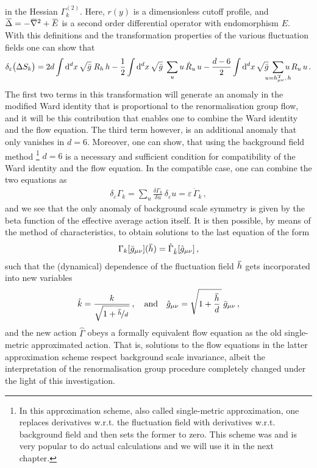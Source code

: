\documentclass[11pt]{book}
\newcommand{\overbar}[1]{\mkern 1.5mu\overline{\mkern-1.5mu#1\mkern-1.5mu}\mkern 1.5mu}
\newcommand\hT{ h^{\scriptscriptstyle{\mathrm{T}} } }
\newcommand{\bnabla}{\overbar \nabla}
\newcommand{\weyl}{\delta_\varepsilon}
\numberwithin{equation}{chapter}
\begin{document}
in the Hessian $\Gamma^{(2)}_k$. Here, $r(y)$ is a dimensionless cutoff profile, and
$\overbar \Delta = -\bnabla^2 + \overbar E$ is a second order differential operator with
endomorphism $E$. With this definitions and the transformation properties of the various
fluctuation fields one can show that
\begin{align}
  \weyl \big( \Delta S_k \big) =
  2d \int \mathrm d^dx \, \sqrt{\bar g} \; R_h \, h
  - \frac 12 \int \mathrm d^dx \, \sqrt{\bar g} \; \sum_u u \, \dot R_u \, u
  - \frac {d-6}2 \int \mathrm d^dx \, \sqrt{\bar g} \;
  \smashoperator{\sum_{u=\hT_{\mu\nu},\,h}} u \, R_u \, u \,.
\end{align}
The first two terms in this transformation will generate an anomaly in the modified Ward
identity that is proportional to the renormalisation group flow, and it will be this
contribution that enables one to combine the Ward identity and the flow equation. The
third term however, is an additional anomaly that only vanishes in $d=6$. Moreover,
one can show, that using the background field method%
\footnote{%
  In this approximation scheme, also called single-metric approximation, one
  replaces derivatives w.r.t. the fluctuation field with derivatives w.r.t. background
  field and then sets the former to zero. This scheme was and is very popular
  to do actual calculations and we will use it in the next chapter.
}
$d=6$ is a necessary and sufficient condition for compatibility of the Ward identity and
the flow equation.
In the compatible case, one can combine the two equations as
\begin{align}
  \weyl \Gamma_k = \sum_u \frac{ \delta \Gamma_k }{ \delta u } \, \weyl u
  = \varepsilon \, \dot \Gamma_k \,,
\end{align}
and we see that the only anomaly of background scale symmetry is given by the
beta function of the effective average action itself.
It is then possible, by means of the method of characteristics, to obtain
solutions to the last equation of the form
\begin{align}
  \Gamma_k [ \bar g_{\mu\nu} ] (\overbar h) =
  \hat \Gamma_{\hat k} [ \hat g_{\mu\nu} ] \,,
\end{align}
such that the (dynamical) dependence of the fluctuation field $\overbar h$
gets incorporated into new variables
\begin{align}
  \hat k = \frac{ k }{ \sqrt{ 1 + \nicefrac{ \overbar h }{d} \, }} \,,
  \quad \text{and} \quad
  \hat g_{\mu\nu} = \sqrt{ 1 + \frac{ \overbar h }{d} \, } \,
  \bar g_{\mu\nu} \,,
\end{align}
and the new action $\hat \Gamma$ obeys a formally equivalent flow equation
as the old single-metric approximated action. That is, solutions to the flow
equations in the latter approximation scheme respect background scale invariance,
albeit the interpretation of the renormalisation group procedure completely
changed under the light of this investigation.
\end{document}
